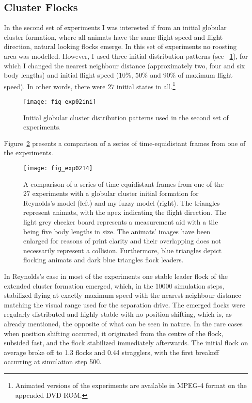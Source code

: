 \subsection{Cluster Flocks}
In the second set of experiments I was interested if from an initial globular cluster formation, where all animats have the same flight speed and flight direction, natural looking flocks emerge. In this set of experiments no roosting area was modelled. However, I used three initial distribution patterns (see \fig~\ref{fig:exp:02:ini}), for which I changed the nearest neighbour distance (approximately two, four and six body lengths) and initial flight speed (10\%, 50\% and 90\% of maximum flight speed). In other words, there were 27 initial states in all.\footnote{Animated versions of the experiments are available in MPEG-4 format on the appended DVD-ROM.}

\begin{figure}
  \texttt{[image: fig\_exp02ini]}
  \caption{Initial globular cluster distribution patterns used in the second set of experiments.}
  \label{fig:exp:02:ini}
\end{figure}

Figure~\ref{fig:exp:02:14} presents a comparison of a series of time-equidistant frames from one of the experiments.
%
\begin{figure}[!ht]
  \null\vspace*{1mm}
  \texttt{[image: fig\_exp0214]}
  \par\vspace*{1mm}
  \caption{A comparison of a series of time-equidistant frames from one of the 27 experiments with a globular cluster initial formation for Reynolds's model \cite{reynolds:1999} (left) and my fuzzy model (right). The triangles represent animats, with the apex indicating the flight direction. The light grey checker board represents a measurement aid with a tile being five body lengths in size. The animats' images have been enlarged for reasons of print clarity and their overlapping does not necessarily represent a collision. Furthermore, blue triangles depict flocking animats and dark blue triangles flock leaders.}
  \label{fig:exp:02:14}
\end{figure}
%
In Reynolds's case in most of the experiments one stable leader flock of the extended cluster formation emerged, which, in the 10000 simulation steps, stabilized flying at exactly maximum speed with the nearest neighbour distance matching the visual range used for the separation drive. The emerged flocks were regularly distributed and highly stable with no position shifting, which is, as already mentioned, the opposite of what can be seen in nature. In the rare cases when position shifting occurred, it originated from the centre of the flock, subsided fast, and the flock stabilized immediately afterwards. The initial flock on average broke off to 1.3 flocks and 0.44 stragglers, with the first breakoff occurring at simulation step 500.

